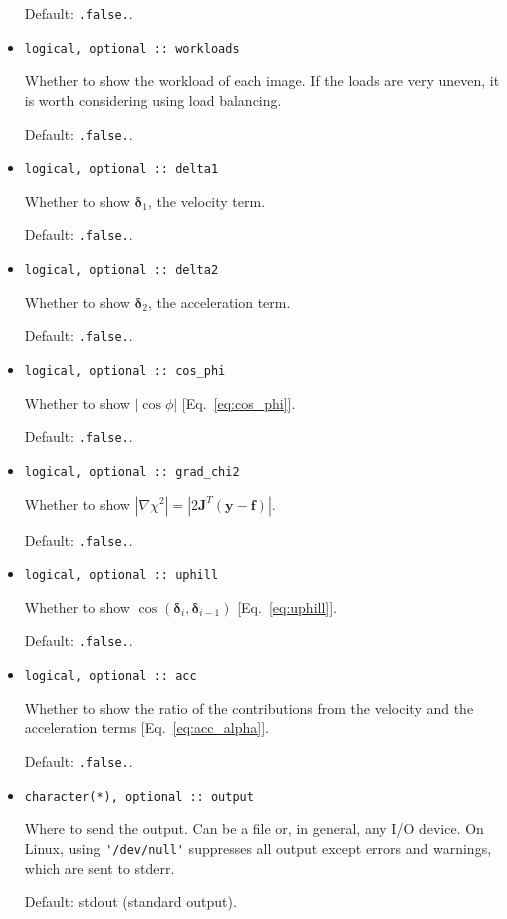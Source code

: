 \documentclass{article}
\begin{document}
\begin{itemize}
  Default: \verb+.false.+.
\item
\begin{verbatim}
logical, optional :: workloads
\end{verbatim}
  Whether to show the workload of each image. If the loads are very uneven, it is worth considering using load balancing.

  Default: \verb+.false.+.
\item
\begin{verbatim}
logical, optional :: delta1
\end{verbatim}
  Whether to show $\bm\delta_1$, the velocity term.

  Default: \verb+.false.+.
\item
\begin{verbatim}
logical, optional :: delta2
\end{verbatim}
  Whether to show $\bm\delta_2$, the acceleration term.

  Default: \verb+.false.+.
\item
\begin{verbatim}
logical, optional :: cos_phi
\end{verbatim}
  Whether to show $|\cos\phi|$ [Eq.~\eqref{eq:cos_phi}].

  Default: \verb+.false.+.
\item
\begin{verbatim}
logical, optional :: grad_chi2
\end{verbatim}
  Whether to show $|\nabla \chi^2| = |2\bm J^T (\bm y - \bm f)|$.

  Default: \verb+.false.+.
\item
\begin{verbatim}
logical, optional :: uphill
\end{verbatim}
  Whether to show $\cos(\bm\delta_i,\bm\delta_{i-1})$
  [Eq.~\eqref{eq:uphill}].

  Default: \verb+.false.+.
\item
\begin{verbatim}
logical, optional :: acc
\end{verbatim}
  Whether to show the ratio of the contributions from the velocity and the acceleration terms [Eq.~\eqref{eq:acc_alpha}].

  Default: \verb+.false.+.
\item
\begin{verbatim}
character(*), optional :: output
\end{verbatim}
  Where to send the output. Can be a file or, in general, any I/O device. On Linux, using \verb+'/dev/null'+ suppresses all output except errors and warnings, which are sent to stderr.

  Default: stdout (standard output).
\end{itemize}
\end{document}
